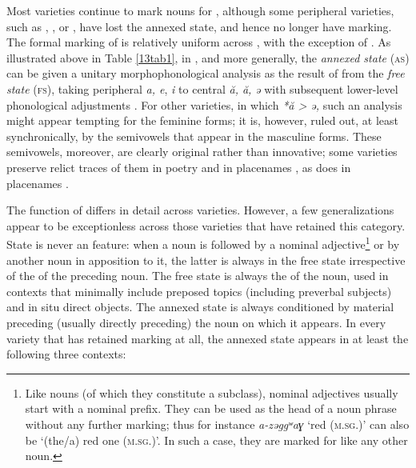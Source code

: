 \documentclass[output=paper,colorlinks,citecolor=brown]{langscibook}
\begin{document}
Most  varieties continue to mark nouns for , although some peripheral varieties, such as  \citep{souag2013},  \citep{vanputten2014}, or  \citep{lux2013}, have lost the annexed state, and hence no longer have  marking. The formal marking of \textit{} is relatively uniform across , with the exception of . As illustrated above in Table \ref{13tab1}, in , and  more generally, the \textit{annexed state} (\textsc{as}) can be given a unitary morphophonological analysis as the result of  from the \textit{free state} (\textsc{fs}), taking peripheral \emph{a, e}, \emph{i} to central \emph{ă, ă,} \emph{ə} with subsequent lower-level phonological adjustments \citep[147]{heath2005-grammar}. For other  varieties, in which \emph{*ă \textgreater{} ə,} such an analysis might appear tempting for the feminine forms; it is, however, ruled out, at least synchronically, by the semivowels that appear in the masculine forms. These semivowels, moreover, are clearly original rather than innovative; some  varieties preserve relict traces of them in poetry and in placenames \citep{brugnatelli1997}, as does  in placenames \citep{taine-cheikh2005}.

The function of \textit{} differs in detail across  varieties. However, a few generalizations appear to be exceptionless across those varieties that have retained this category. State is never an  feature: when a noun is followed by a nominal adjective\footnote{Like nouns (of which they constitute a subclass), nominal adjectives usually start with a nominal prefix. They can be used as the head of a noun phrase without any further marking; thus for instance \emph{a-zəggʷaɣ} `red (\textsc{m.sg.})' can also be `(the/a) red one (\textsc{m.sg.})'. In such a case, they are marked for  like any other noun.} or by another noun in apposition to it, the latter is always in the free state irrespective of the  of the preceding noun. The free state is always the  of the noun, used in contexts that minimally include preposed topics (including preverbal subjects) and in situ direct objects. The annexed state is always conditioned by material preceding (usually directly preceding) the noun on which it appears. In every variety that has retained  marking at all, the annexed state appears in at least the following three contexts:
\end{document}
